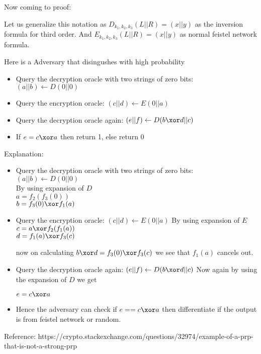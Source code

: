 \begin{itemize}
			
			Now coming to proof:


			Let us generalize this notation as $D_{k_1,k_2,k_3} \left (L||R\right ) = \left (x||y\right ) $ as the inversion formula for third order.			
			And $E_{k_1,k_2,k_3} \left (L||R\right ) = \left (x||y\right ) $ as normal feistel network formula.


			Here is a Adversary that disingushes with high probability

			\begin{itemize}
				\item Query the decryption oracle with two strings of zero bits: $(a||b) \leftarrow D(0||0)$
				\item Query the encryption oracle:  $(c||d) \leftarrow E(0||a)$ 
				\item Query the decryption oracle again: $(e||f) \leftarrow D(b \xor d ||c)$ 
				\item If $ e= c\xor a$ then return 1, else return 0
			\end{itemize}
			
			Explanation:
			\begin{itemize}
				\item Query the decryption oracle with two strings of zero bits: $(a||b) \leftarrow D(0||0)$\\
				By using expansion of $D$ \\
				$ a =f_2(f_3(0)) $\\
				$ b= f_3(0) \xor f_1(a)$
				\item Query the encryption oracle:  $(c||d) \leftarrow E(0||a)$ 
				By using expansion of $E$ \\
				$ c = a\xor f_2(f_1(a)) $\\
				$ d = f_1(a) \xor f_3(c)$


				now on calculating $b\xor d = f_3(0) \xor f_3(c)$ we see that $f_1(a)$ cancels out.
				\item Query the decryption oracle again: $(e||f) \leftarrow D(b \xor d ||c)$ 
				Now again by using the expansion of $D$ we get 

				$e = c \xor a$
				\item Hence the adversary can check if $ e == c\xor a$ then differentiate if the output is from feistel network or random.
			\end{itemize}
			Reference: https://crypto.stackexchange.com/questions/32974/example-of-a-prp-that-is-not-a-strong-prp



\end{itemize}